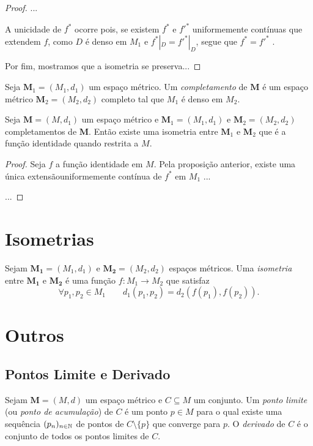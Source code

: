 \begin{proof}
...

	A unicidade de $f^*$ ocorre pois, se existem $f^*$ e $f'^*$ uniformemente contínuas que extendem $f$, como $D$ é denso em $M_1$ e $f^*|_D = f'^*|_D$, segue que $f^* = f'^*$ .
	
	Por fim, mostramos que a isometria se preserva...
\end{proof}

\begin{defi}
	Seja $\bm M_1 = (M_1,d_1)$  um espaço métrico. Um \emph{completamento} de $\bm M$ é um espaço métrico $\bm M_2 = (M_2,d_2)$ completo tal que $M_1$ é denso em $M_2$.
\end{defi}

\begin{prop}
	Seja $\bm M = (M,d_1)$ um espaço métrico e $\bm M_1 = (M_1,d_1)$ e $\bm M_2 = (M_2,d_2)$ completamentos de $\bm M$. Então existe uma isometria entre $\bm M_1$ e $\bm M_2$ que é a função identidade quando restrita a $M$.
\end{prop}
\begin{proof}
	Seja $f$ a função identidade em $M$. Pela proposição anterior, existe uma única extensãouniformemente contínua de $f^*$ em $M_1$ ...
	
	...
\end{proof}


\section{Isometrias}

\begin{defi}
	Sejam $\bm{M_1}=(M_1,d_1)$ e $\bm{M_2}=(M_2,d_2)$ espaços métricos. Uma \emph{isometria} entre $\bm{M_1}$ e $\bm{M_2}$ é uma função $f: M_1 \to M_2$ que satisfaz
	\begin{equation*}
	\forall p_1,p_2 \in M_1 \qquad d_1(p_1,p_2) = d_2(f(p_1),f(p_2)).
	\end{equation*}
\end{defi}

\section{Outros}

\subsection{Pontos Limite e Derivado}

\begin{defi}
	Sejam $\bm M = (M,d)$ um espaço métrico e $C \subseteq M$ um conjunto. Um \emph{ponto limite} (ou \emph{ponto de acumulação}) de $C$ é um ponto $p \in M$ para o qual existe uma sequência $(p_n)_{n \in \mathbb{N}}$ de pontos de $C \setminus \{p\}$ que converge para $p$. O \emph{derivado} de $C$ é o conjunto de todos os pontos limites de $C$. 
\end{defi}

